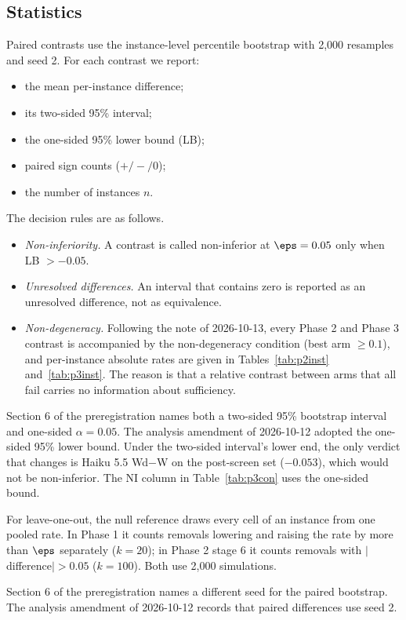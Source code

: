 \subsection{Statistics}

Paired contrasts use the instance-level percentile bootstrap with 2,000 resamples and seed 2. For each contrast we report:
\begin{itemize}
\item the mean per-instance difference;
\item its two-sided 95\% interval;
\item the one-sided 95\% lower bound (LB);
\item paired sign counts ($+/-/0$);
\item the number of instances $n$.
\end{itemize}

The decision rules are as follows.
\begin{itemize}
\item \emph{Non-inferiority.} A contrast is called non-inferior at $\eps = 0.05$ only when LB $> -0.05$.
\item \emph{Unresolved differences.} An interval that contains zero is reported as an unresolved difference, not as equivalence.
\item \emph{Non-degeneracy.} Following the note of 2026-10-13, every Phase 2 and Phase 3 contrast is accompanied by the non-degeneracy condition (best arm $\geq 0.1$), and per-instance absolute rates are given in Tables~\ref{tab:p2inst} and~\ref{tab:p3inst}. The reason is that a relative contrast between arms that all fail carries no information about sufficiency.
\end{itemize}

Section 6 of the preregistration names both a two-sided 95\% bootstrap interval and one-sided $\alpha=0.05$. The analysis amendment of 2026-10-12 adopted the one-sided 95\% lower bound. Under the two-sided interval's lower end, the only verdict that changes is Haiku 5.5 Wd$-$W on the post-screen set ($-0.053$), which would not be non-inferior. The NI column in Table~\ref{tab:p3con} uses the one-sided bound.

For leave-one-out, the null reference draws every cell of an instance from one pooled rate. In Phase 1 it counts removals lowering and raising the rate by more than $\eps$ separately ($k=20$); in Phase 2 stage 6 it counts removals with $|$difference$| > 0.05$ ($k=100$). Both use 2,000 simulations.

Section 6 of the preregistration names a different seed for the paired bootstrap. The analysis amendment of 2026-10-12 records that paired differences use seed 2.

